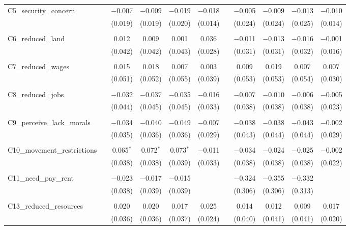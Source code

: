 \begin{table}[H]
\begin{tabular}{@{\extracolsep{4pt}}lcccccccccc}
 C5\_security\_concern &  & $-$0.007 & $-$0.009 & $-$0.019 & $-$0.018 &  & $-$0.005 & $-$0.009 & $-$0.013 & $-$0.010 \\ 
  &  & (0.019) & (0.019) & (0.020) & (0.014) &  & (0.024) & (0.024) & (0.025) & (0.014) \\ 
  & & & & & & & & & & \\ 
 C6\_reduced\_land &  & 0.012 & 0.009 & 0.001 & 0.036 &  & $-$0.011 & $-$0.013 & $-$0.016 & $-$0.001 \\ 
  &  & (0.042) & (0.042) & (0.043) & (0.028) &  & (0.031) & (0.031) & (0.032) & (0.016) \\ 
  & & & & & & & & & & \\ 
 C7\_reduced\_wages &  & 0.015 & 0.018 & 0.007 & 0.003 &  & 0.009 & 0.019 & 0.007 & 0.007 \\ 
  &  & (0.051) & (0.052) & (0.055) & (0.039) &  & (0.053) & (0.053) & (0.054) & (0.030) \\ 
  & & & & & & & & & & \\ 
 C8\_reduced\_jobs &  & $-$0.032 & $-$0.037 & $-$0.035 & $-$0.016 &  & $-$0.007 & $-$0.010 & $-$0.006 & $-$0.005 \\ 
  &  & (0.044) & (0.045) & (0.045) & (0.033) &  & (0.038) & (0.038) & (0.038) & (0.023) \\ 
  & & & & & & & & & & \\ 
 C9\_perceive\_lack\_morals &  & $-$0.034 & $-$0.040 & $-$0.049 & $-$0.007 &  & $-$0.038 & $-$0.038 & $-$0.043 & $-$0.002 \\ 
  &  & (0.035) & (0.036) & (0.036) & (0.029) &  & (0.043) & (0.044) & (0.044) & (0.029) \\ 
  & & & & & & & & & & \\ 
 C10\_movement\_restrictions &  & 0.065$^{*}$ & 0.072$^{*}$ & 0.073$^{*}$ & $-$0.011 &  & $-$0.034 & $-$0.024 & $-$0.025 & $-$0.002 \\ 
  &  & (0.038) & (0.038) & (0.039) & (0.033) &  & (0.038) & (0.038) & (0.038) & (0.022) \\ 
  & & & & & & & & & & \\ 
 C11\_need\_pay\_rent &  & $-$0.023 & $-$0.017 & $-$0.015 &  &  & $-$0.324 & $-$0.355 & $-$0.332 &  \\ 
  &  & (0.038) & (0.039) & (0.039) &  &  & (0.306) & (0.306) & (0.313) &  \\ 
  & & & & & & & & & & \\ 
 C13\_reduced\_resources &  & 0.020 & 0.020 & 0.017 & 0.025 &  & 0.014 & 0.012 & 0.009 & 0.017 \\ 
  &  & (0.036) & (0.036) & (0.037) & (0.024) &  & (0.040) & (0.041) & (0.041) & (0.020) \\ 

\end{tabular}
\end{table}
